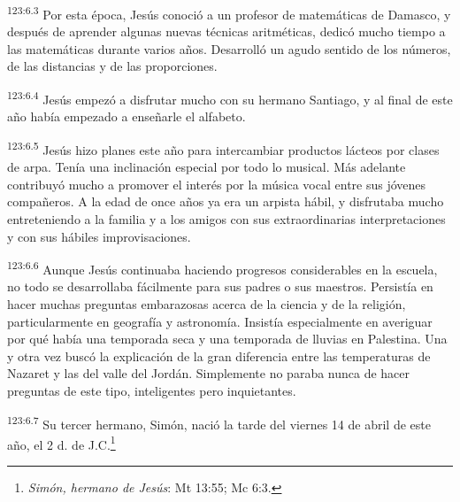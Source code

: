 \par
\textsuperscript{123:6.3} Por esta época, Jesús conoció a un profesor de matemáticas de Damasco, y después de aprender algunas nuevas técnicas aritméticas, dedicó mucho tiempo a las matemáticas durante varios años. Desarrolló un agudo sentido de los números, de las distancias y de las proporciones.

\par
\textsuperscript{123:6.4} Jesús empezó a disfrutar mucho con su hermano Santiago, y al final de este año había empezado a enseñarle el alfabeto.

\par
\textsuperscript{123:6.5} Jesús hizo planes este año para intercambiar productos lácteos por clases de arpa. Tenía una inclinación especial por todo lo musical. Más adelante contribuyó mucho a promover el interés por la música vocal entre sus jóvenes compañeros. A la edad de once años ya era un arpista hábil, y disfrutaba mucho entreteniendo a la familia y a los amigos con sus extraordinarias interpretaciones y con sus hábiles improvisaciones.

\par
\textsuperscript{123:6.6} Aunque Jesús continuaba haciendo progresos considerables en la escuela, no todo se desarrollaba fácilmente para sus padres o sus maestros. Persistía en hacer muchas preguntas embarazosas acerca de la ciencia y de la religión, particularmente en geografía y astronomía. Insistía especialmente en averiguar por qué había una temporada seca y una temporada de lluvias en Palestina. Una y otra vez buscó la explicación de la gran diferencia entre las temperaturas de Nazaret y las del valle del Jordán. Simplemente no paraba nunca de hacer preguntas de este tipo, inteligentes pero inquietantes.

\par
\textsuperscript{123:6.7} Su tercer hermano, Simón, nació la tarde del viernes 14 de abril de este año, el 2 d. de J.C.\footnote{\textit{Simón, hermano de Jesús}: Mt 13:55; Mc 6:3.}

